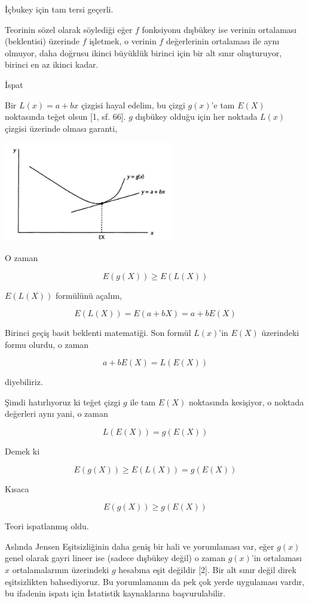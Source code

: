 \documentclass[12pt,fleqn]{article}\usepackage{../../common}
\begin{document}
İçbukey için tam tersi geçerli.

Teorinin sözel olarak söylediği eğer $f$ fonksiyonu dışbükey ise verinin
ortalaması (beklentisi) üzerinde $f$ işletmek, o verinin $f$ değerlerinin
ortalaması ile aynı olmuyor, daha doğrusu ikinci büyüklük birinci için bir
alt sınır oluşturuyor, birinci en az ikinci kadar.

İspat

Bir $L(x) = a + bx$ çizgisi hayal edelim, bu çizgi $g(x)$'e tam $E(X)$
noktasında teğet olsun [1, sf. 66]. $g$ dışbükey olduğu için her noktada
$L(x)$ çizgisi üzerinde olması garanti,

\includegraphics[width=20em]{jensen.jpg}

O zaman

$$
E(g(X)) \ge E(L(X))
$$

$E(L(X))$ formülünü açalım,

$$
E(L(X)) = E(a + bX) = a + bE(X) 
$$

Birinci geçiş basit beklenti matematiği. Son formül $L(x)$'in $E(X)$
üzerindeki formu olurdu, o zaman

$$
a + bE(X) = L(E(X))
$$

diyebiliriz.

Şimdi hatırlıyoruz ki teğet çizgi $g$ ile tam $E(X)$ noktasında kesişiyor, o
noktada değerleri aynı yani, o zaman

$$
L(E(X)) = g(E(X))
$$

Demek ki

$$
E(g(X)) \ge E(L(X)) = g(E(X))
$$

Kısaca

$$
E(g(X)) \ge  g(E(X))
$$

Teori ispatlanmış oldu.

Aslında Jensen Eşitsizliğinin daha geniş bir hali ve yorumlaması var, eğer
$g(x)$ genel olarak gayri lineer ise (sadece dışbükey değil) o zaman $g(x)$'in
ortalaması $x$ ortalamalarının üzerindeki $g$ hesabına eşit değildir [2]. Bir
alt sınır değil direk eşitsizlikten bahsediyoruz. Bu yorumlamanın da pek çok
yerde uygulaması vardır, bu ifadenin ispatı için İstatistik kaynaklarına
başvurulabilir.
\end{document}
